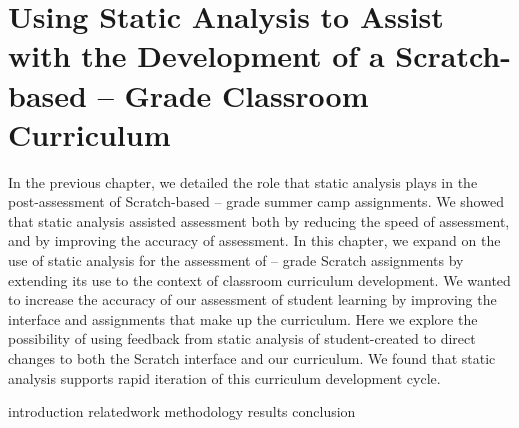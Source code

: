 \chapter{Using Static Analysis to Assist with the Development of a
  Scratch-based -- Grade Classroom Curriculum}
\label{chap:curriculum}

\def\currentprefix{curriculum}

In the previous chapter, we detailed the role that static analysis plays in the
post-assessment of Scratch-based -- grade summer camp
assignments. We showed that static analysis assisted assessment both by
reducing the speed of assessment, and by improving the accuracy of
assessment. In this chapter, we expand on the use of static analysis for the
assessment of -- grade Scratch assignments by extending its use
to the context of classroom curriculum development. We wanted to increase the
accuracy of our assessment of student learning by improving the interface and
assignments that make up the curriculum. Here we explore the possibility of
using feedback from static analysis of student-created  to direct
changes to both the Scratch interface and our curriculum. We found that static
analysis supports rapid iteration of this curriculum development cycle.

{introduction}
{relatedwork}
{methodology}
{results}
{conclusion}
